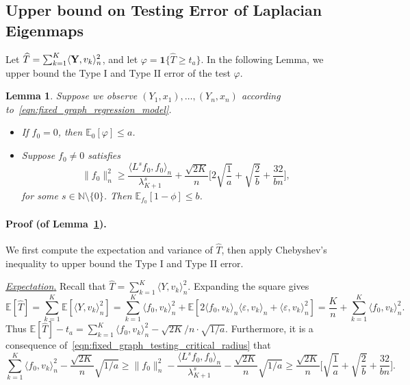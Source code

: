\documentclass[aos]{imsart}
\theoremstyle{plain}
\newtheorem{lemma}{Lemma}
\theoremstyle{definition}
\theoremstyle{remark}
\newcommand{\Ebb}{\mathbb{E}}
\newcommand{\dotp}[2]{\langle #1, #2 \rangle}
\newcommand{\wh}[1]{\widehat{#1}}
\newcommand{\1}{\mathbf{1}}
\begin{document}
\subsection{Upper bound on Testing Error of Laplacian Eigenmaps}

Let $\wh{T} = \sum_{k = 1}^{K} \dotp{{\bf Y}}{v_k}_n^2$, and let $\varphi = \1\{\wh{T} \geq t_a\}$. In the following Lemma, we upper bound the Type I and Type II error of the test $\varphi$.

\begin{lemma}
	\label{lem:fixed_graph_testing}
	Suppose we observe $(Y_1,x_1),\ldots,(Y_n,x_n)$ according to~\eqref{eqn:fixed_graph_regression_model}.
	\begin{itemize}
		\item If $f_0 = 0$, then $\Ebb_0[\varphi] \leq a$.
		\item Suppose $f_0 \neq 0$ satisfies
		\begin{equation}
		\label{eqn:fixed_graph_testing_critical_radius}
		\|f_0\|_n^2 \geq \frac{\dotp{L^sf_0}{f_0}_n}{\lambda_{K + 1}^s} + \frac{\sqrt{2K}}{n}\biggl[2\sqrt{\frac{1}{a}} + \sqrt{\frac{2}{b}} + \frac{32}{bn}\biggr],
		\end{equation}
		for some $s \in \mathbb{N}\setminus \{0\}$. Then $\Ebb_{f_0}[1 - \phi] \leq b$.
	\end{itemize}
\end{lemma}
\paragraph{Proof (of Lemma~\ref{lem:fixed_graph_testing}).}
We first compute the expectation and variance of $\wh{T}$, then apply Chebyshev's inequality to upper bound the Type I and Type II error.

\underline{\emph{Expectation}.}
Recall that $\wh{T} = \sum_{k = 1}^{K} \dotp{Y}{v_k}_n^2$. Expanding the square gives
\begin{equation*}
\Ebb[\wh{T}] = \sum_{k = 1}^{K} \Ebb[\dotp{Y}{v_k}_n^2] = \sum_{k = 1}^{K} \dotp{f_0}{v_k}_n^2 + \Ebb[2\dotp{f_0}{v_k}_n\dotp{\varepsilon}{v_k}_n + \dotp{\varepsilon}{v_k}_n^2] = \frac{K}{n} + \sum_{k = 1}^{K} \dotp{f_0}{v_k}_n^2.
\end{equation*}
Thus $\Ebb[\wh{T}] - t_a = \sum_{k = 1}^{K} \dotp{f_0}{v_k}_n^2 - \sqrt{2K}/n \cdot \sqrt{1/a}$. Furthermore, it is a consequence of~\eqref{eqn:fixed_graph_testing_critical_radius} that 
\begin{equation}
\label{pf:fixed_graph_testing_1}
\sum_{k = 1}^{K} \dotp{f_0}{v_k}_n^2 - \frac{\sqrt{2K}}{n}\sqrt{1/a} \geq \|f_0\|_n^2 - \frac{\dotp{L^sf_0}{f_0}_n}{\lambda_{K + 1}^s} - \frac{\sqrt{2K}}{n}\sqrt{1/a} \geq \frac{\sqrt{2K}}{n}\biggl[\sqrt{\frac{1}{a}} + \sqrt{\frac{2}{b}} + \frac{32}{bn}\biggr].
\end{equation} 
\end{document}
